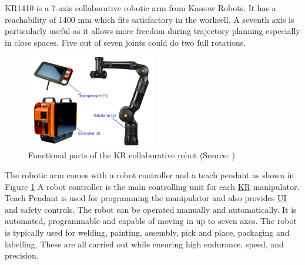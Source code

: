KR1410 is a 7-axis collaborative robotic arm from Kassow Robots. It has a reachability of 1400 mm which fits
satisfactory in the workcell. A seventh axis is particularly useful as it allows more freedom during trajectory planning
especially in close spaces. Five out of seven joints could do two full rotations.

\begin{figure}[h]
    \centering
    \includegraphics[width=0.5\textwidth]{figures/kassow-robot-parts.png}
    \caption{Functional parts of the KR collaborative robot (Source: \cite{kassow-manual})}
    \label{fig:kassow-robot-parts}
\end{figure}

The robotic arm comes with a robot controller and a teach pendant as shown in Figure \ref{fig:kassow-robot-parts} A robot controller is the main controlling unit for each \hyperref[acro:KR]{KR} manipulator.
Teach Pendant is used for programming the manipulator and also provides \hyperref[acro:UI]{UI} and safety controls. 
The robot can be operated manually and automatically. It is automated, programmable and capable of
moving in up to seven axes. The robot is typically used for welding, painting, assembly, pick and place,
packaging and labelling. These are all carried out while ensuring high endurance, speed, and precision. \cite[page 23]{kassow-manual}


